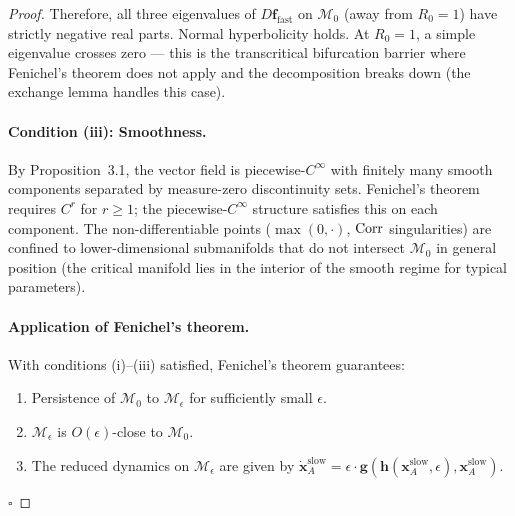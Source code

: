 \begin{proof}
Therefore, all three eigenvalues of $D\mathbf{f}_{\text{fast}}$ on
$\mathcal{M}_0$ (away from $R_0 = 1$) have strictly negative real parts.
Normal hyperbolicity holds. At $R_0 = 1$, a simple eigenvalue crosses
zero --- this is the transcritical bifurcation barrier where Fenichel's
theorem does not apply and the decomposition breaks down (the exchange
lemma handles this case).

\paragraph{Condition (iii): Smoothness.}
By Proposition~3.1, the vector field is piecewise-$C^\infty$ with
finitely many smooth components separated by measure-zero discontinuity
sets. Fenichel's theorem requires $C^r$ for $r \geq 1$; the
piecewise-$C^\infty$ structure satisfies this on each component.
The non-differentiable points ($\max(0,\cdot)$, $\operatorname{Corr}$ singularities)
are confined to lower-dimensional submanifolds that do not intersect
$\mathcal{M}_0$ in general position (the critical manifold lies in the
interior of the smooth regime for typical parameters).

\paragraph{Application of Fenichel's theorem.}
With conditions (i)--(iii) satisfied, Fenichel's theorem guarantees:
\begin{enumerate}[nosep]
\item Persistence of $\mathcal{M}_0$ to $\mathcal{M}_\epsilon$ for
  sufficiently small $\epsilon$.
\item $\mathcal{M}_\epsilon$ is $O(\epsilon)$-close to $\mathcal{M}_0$.
\item The reduced dynamics on $\mathcal{M}_\epsilon$ are given by
  $\dot{\mathbf{x}}_A^{\text{slow}} = \epsilon \cdot
  \mathbf{g}(\mathbf{h}(\mathbf{x}_A^{\text{slow}}, \epsilon),
  \mathbf{x}_A^{\text{slow}})$.
\end{enumerate}
$\square$
\end{proof}

